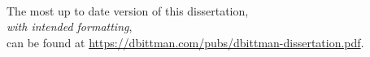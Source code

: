 
\begingroup
\let\clearpage\relax
\let\cleardoublepage\relax
\let\cleardoublepage\relax

\vspace*{40mm}
\begin{center}
    {
        \Large {}
    }\\
    \vspace*{20mm}
    The most up to date version of this dissertation,\\
    \emph{with intended formatting},\\
    can be found at \url{https://dbittman.com/pubs/dbittman-dissertation.pdf}.
\end{center}
\vfill

\endgroup

